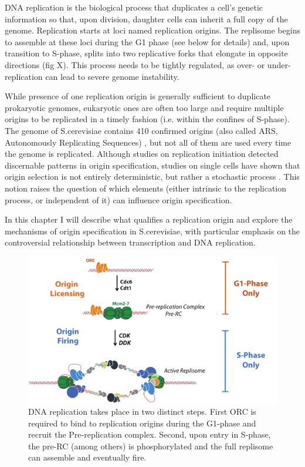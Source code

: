 DNA replication is the biological process that duplicates a cell’s genetic information so that, upon division, daughter cells can inherit a full copy of the genome. 
Replication starts at loci named replication origins. The replisome begins to assemble at these loci during the G1 phase (see below for details) and, upon transition to S-phase, splits into two replicative forks that elongate in opposite directions (fig X). 
This process needs to be tightly regulated, as over- or under-replication can lead to severe genome instability. 


While presence of one replication origin is generally sufficient to duplicate prokaryotic genomes, eukaryotic ones are often too large and require multiple origins to be replicated in a timely fashion (i.e. within the confines of S-phase). 
The genome of S.cerevisiae contains 410 confirmed origins (also called ARS, Autonomously Replicating Sequences) \cite{siow:2012:oridb}, but not all of them are used every time the genome is replicated.
Although studies on replication initiation detected discernable patterns in origin specification, studies on single cells have shown that origin selection is not entirely deterministic, but rather a stochastic process \cite{patel:2006:dna, Czajkowsky:2008:dna}. 
This notion raises the question of which elements (either intrinsic to the replication process, or independent of it) can influence origin specification.


In this chapter I will describe what qualifies a replication origin and explore the mechanisms of origin specification in S.cerevisiae, with particular emphasis on the controversial relationship between transcription and DNA replication.



\begin{figure}[ht]

\centering
\includegraphics[width=\textwidth]{figures/introduction/repSteps}
\caption[Stepwise mechanism of DNA replication]{DNA replication takes place in two distinct steps. First ORC is required to bind to replication origins during the G1-phase and recruit the Pre-replication complex. Second, upon entry in S-phase, the pre-RC (among others) is phosphorylated and the full replisome can assemble and eventually fire.}
\label{fig:repSteps}

\end{figure}


